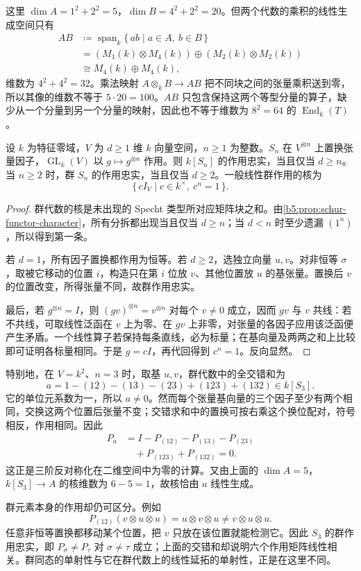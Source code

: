 \ProseParagraphBreak
这里 \(\dim A=1^2+2^2=5\)，\(\dim B=4^2+2^2=20\)。但两个代数的乘积的线性生成空间只有
\[
	\begin{aligned}
		AB&\coloneqq\operatorname{span}_k\{\,ab\mid a\in A,\ b\in B\,\}\\
		&=(M_1(k)\otimes M_4(k))\oplus(M_2(k)\otimes M_2(k))\\
		&\cong M_4(k)\oplus M_4(k),
	\end{aligned}
\]
维数为 \(4^2+4^2=32\)。乘法映射 \(A\otimes_kB\to AB\) 把不同块之间的张量乘积送到零，所以其像的维数不等于 \(5\cdot20=100\)。\(AB\) 只包含保持这两个等型分量的算子，缺少从一个分量到另一个分量的映射，因此也不等于维数为 \(8^2=64\) 的 \(\operatorname{End}_k(T)\)。

\begin{proposition}\label{b5:prop:tensor-faithfulness}
	设 \(k\) 为特征零域，\(V\) 为 \(d\ge1\) 维 \(k\) 向量空间，\(n\ge1\) 为整数。\(S_n\) 在 \(V^{\otimes n}\) 上置换张量因子，\(\operatorname{GL}_k(V)\) 以 \(g\mapsto g^{\otimes n}\) 作用。则 \(k[S_n]\) 的作用忠实，当且仅当 \(d\ge n\)。当 \(n\ge2\) 时，群 \(S_n\) 的作用忠实，当且仅当 \(d\ge2\)。一般线性群作用的核为
	\[
		\{\,cI_V\mid c\in k^\times,\ c^n=1\,\}.
	\]
\end{proposition}
\begin{proof}
	群代数的核是未出现的 Specht 类型所对应矩阵块之和。由\cref{b5:prop:schur-functor-character}，所有分拆都出现当且仅当 \(d\ge n\)；当 \(d<n\) 时至少遗漏 \((1^n)\)，所以得到第一条。

	若 \(d=1\)，所有因子置换都作用为恒等。若 \(d\ge2\)，选独立向量 \(u,v\)。对非恒等 \(\sigma\)，取被它移动的位置 \(i\)，构造只在第 \(i\) 位放 \(v\)、其他位置放 \(u\) 的基张量。置换后 \(v\) 的位置改变，所得张量不同，故群作用忠实。

	最后，若 \(g^{\otimes n}=I\)，则 \((gv)^{\otimes n}=v^{\otimes n}\) 对每个 \(v\ne0\) 成立，因而 \(gv\) 与 \(v\) 共线：若不共线，可取线性泛函在 \(v\) 上为零、在 \(gv\) 上非零，对张量的各因子应用该泛函便产生矛盾。一个线性算子若保持每条直线，必为标量；在基向量及两两之和上比较即可证明各标量相同。于是 \(g=cI\)，再代回得到 \(c^n=1\)。反向显然。
\end{proof}

特别地，在 \(V=k^2\)、\(n=3\) 时，取基 \(u,v\)，群代数中的全交错和为
\[
	a=1-(12)-(13)-(23)+(123)+(132)\in k[S_3].
\]
它的单位元系数为一，所以 \(a\ne0\)。然而每个张量基向量的三个因子至少有两个相同，交换这两个位置后张量不变；交错求和中的置换可按右乘这个换位配对，符号相反，作用相同。因此
\[
	\begin{aligned}
		P_a&=I-P_{(12)}-P_{(13)}-P_{(23)}\\
		&\quad+P_{(123)}+P_{(132)}=0.
	\end{aligned}
\]
这正是三阶反对称化在二维空间中为零的计算。又由上面的 \(\dim A=5\)，\(k[S_3]\to A\) 的核维数为 \(6-5=1\)，故核恰由 \(a\) 线性生成。

\ProseParagraphBreak
群元素本身的作用却仍可区分。例如
\[
	P_{(12)}(v\otimes u\otimes u)=u\otimes v\otimes u \ne v\otimes u\otimes u.
\]
任意非恒等置换都移动某个位置，把 \(v\) 只放在该位置就能检测它。因此 \(S_3\) 的群作用忠实，即 \(P_\sigma\ne P_\tau\) 对 \(\sigma\ne\tau\) 成立；上面的交错和却说明六个作用矩阵线性相关。群同态的单射性与它在群代数上的线性延拓的单射性，正是在这里不同。
